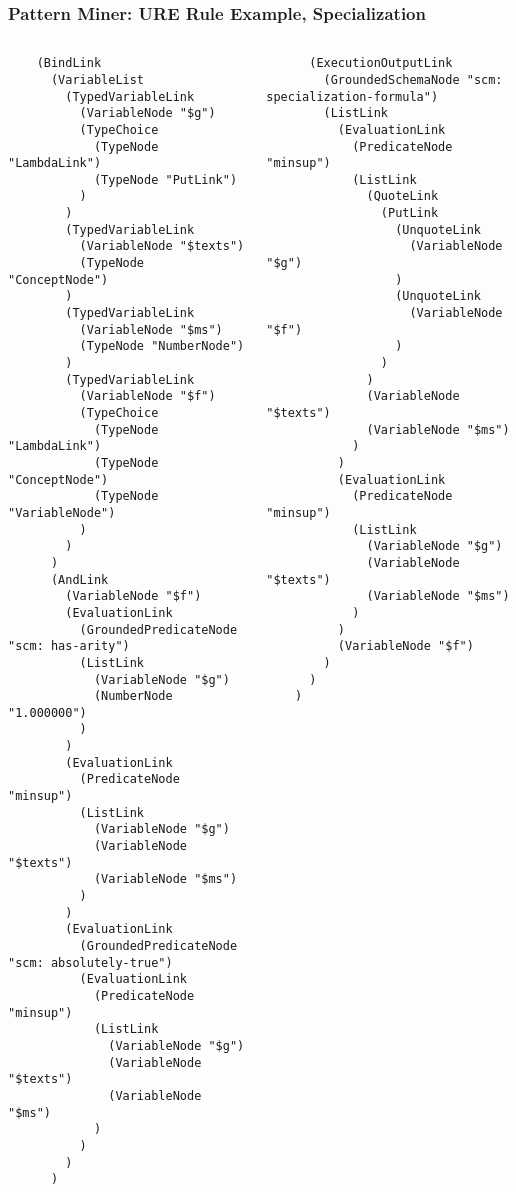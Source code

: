 \documentclass{beamer}
\begin{document}
\begin{frame}[fragile]
  \frametitle{Pattern Miner: URE Rule Example, Specialization}

  \begin{columns}
    \column{1.5in}
{\TINY
\begin{verbatim}
    (BindLink
      (VariableList
        (TypedVariableLink
          (VariableNode "$g")
          (TypeChoice
            (TypeNode "LambdaLink")
            (TypeNode "PutLink")
          )
        )
        (TypedVariableLink
          (VariableNode "$texts")
          (TypeNode "ConceptNode")
        )
        (TypedVariableLink
          (VariableNode "$ms")
          (TypeNode "NumberNode")
        )
        (TypedVariableLink
          (VariableNode "$f")
          (TypeChoice
            (TypeNode "LambdaLink")
            (TypeNode "ConceptNode")
            (TypeNode "VariableNode")
          )
        )
      )
      (AndLink
        (VariableNode "$f")
        (EvaluationLink
          (GroundedPredicateNode "scm: has-arity")
          (ListLink
            (VariableNode "$g")
            (NumberNode "1.000000")
          )
        )
        (EvaluationLink
          (PredicateNode "minsup")
          (ListLink
            (VariableNode "$g")
            (VariableNode "$texts")
            (VariableNode "$ms")
          )
        )
        (EvaluationLink
          (GroundedPredicateNode "scm: absolutely-true")
          (EvaluationLink
            (PredicateNode "minsup")
            (ListLink
              (VariableNode "$g")
              (VariableNode "$texts")
              (VariableNode "$ms")
            )
          )
        )
      )
\end{verbatim}}

  \column{1.5in}

  {\TINY
\begin{verbatim}
      (ExecutionOutputLink
        (GroundedSchemaNode "scm: specialization-formula")
        (ListLink
          (EvaluationLink
            (PredicateNode "minsup")
            (ListLink
              (QuoteLink
                (PutLink
                  (UnquoteLink
                    (VariableNode "$g")
                  )
                  (UnquoteLink
                    (VariableNode "$f")
                  )
                )
              )
              (VariableNode "$texts")
              (VariableNode "$ms")
            )
          )
          (EvaluationLink
            (PredicateNode "minsup")
            (ListLink
              (VariableNode "$g")
              (VariableNode "$texts")
              (VariableNode "$ms")
            )
          )
          (VariableNode "$f")
        )
      )
    )
\end{verbatim}}

\end{columns}

\end{frame}
\end{document}
